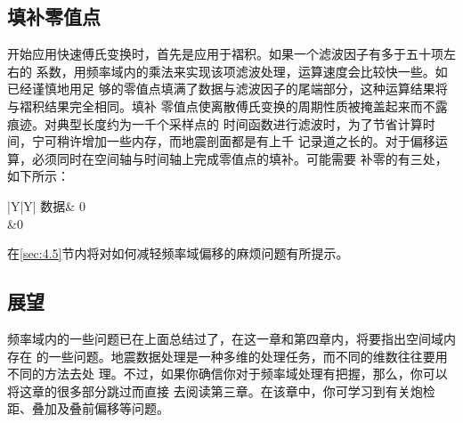 \subsection{填补零值点}
\label{sec:2.0.4}

开始应用快速傅氏变换时，首先是应用于褶积。如果一个滤波因子有多于五十项左右的
系数，用频率域内的乘法来实现该项滤波处理，运算速度会比较快一些。如已经谨慎地用足
够的零值点填满了数据与滤波因子的尾端部分，这种运算结果将与褶积结果完全相同。填补
零值点使离散傅氏变换的周期性质被掩盖起来而不露痕迹。对典型长度约为一千个采样点的
时间函数进行滤波时，为了节省计算时间，宁可稍许增加一些内存，而地震剖面都是有上千
记录道之长的。对于偏移运算，必须同时在空间轴与时间轴上完成零值点的填补。可能需要
补零的有三处，如下所示：
\begin{table}[!ht]
\centering
\ttfamily
\small
\begin{tabularx}{\textwidth}{|Y|Y|}
\hline
 数据& 0 \\
{}&0\\
\hline


\end{tabularx}
\end{table}
在\ref{sec:4.5}节内将对如何减轻频率域偏移的麻烦问题有所提示。

\subsection{展望}
\label{sec:2.0.5}

频率域内的一些问题已在上面总结过了，在这一章和第四章内，将要指出空间域内存在
的一些问题。地震数据处理是一种多维的处理任务，而不同的维数往往要用不同的方法去处
理。不过，如果你确信你对于频率域处理有把握，那么，你可以将这章的很多部分跳过而直接
去阅读第三章。在该章中，你可学习到有关炮检距、叠加及叠前偏移等问题。
